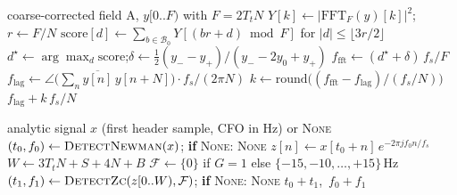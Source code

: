 \begin{algorithm}[H]
\caption{\textsc{ResidualCfo} for one-symbol blocks ($s = 1$, NORMAL float): FFT peak plus unwrapped lag-$N$ phase.}
\label{alg:tone_resid}
\begin{algorithmic}[1]
\Require coarse-corrected field A, $y[0..F)$ with $F = 2T_tN$
\State $Y[k] \gets |\mathrm{FFT}_F(y)[k]|^2$;\quad $r \gets F/N$ 
\State $\mathrm{score}[d] \gets \sum_{b \in \mathcal{B}_0} Y[(br + d) \bmod F]$ for $|d| \le \lfloor 3r/2 \rfloor$ 
\State $d^\star \gets \arg\max_d \mathrm{score}$;\quad $\delta \gets \tfrac{1}{2}(y_{-} - y_{+}) / (y_{-} - 2y_0 + y_{+})$ 
\State $f_{\mathrm{fft}} \gets (d^\star + \delta)\, f_s / F$ 
\State $f_{\mathrm{lag}} \gets \angle\big(\sum_n \overline{y[n]}\, y[n{+}N]\big) \cdot f_s / (2\pi N)$ 
\State $k \gets \mathrm{round}\big((f_{\mathrm{fft}} - f_{\mathrm{lag}}) / (f_s/N)\big)$
\State \Return $f_{\mathrm{lag}} + k\, f_s/N$ 
\end{algorithmic}
\end{algorithm}

\begin{algorithm}[H]
\caption{Composite detector (\texttt{FullOFDMModem.detect\_preamble}): tone stage, then the ZC stage of \S\ref{sec:zc}.}
\label{alg:tone_composite}
\begin{algorithmic}[1]
\Require analytic signal $x$
\Ensure (first header sample, CFO in Hz) or \textsc{None}
\State $(t_0, f_0) \gets \textsc{DetectNewman}(x)$; \textbf{if} \textsc{None}: \Return \textsc{None} 
\State $z[n] \gets x[t_0 + n]\, e^{-2\pi j f_0 n / f_s}$ 
\State $W \gets 3T_tN + S + 4N + B$ 
\State $\mathcal{F} \gets \{0\}$ if $G = 1$ else $\{-15, -10, \ldots, +15\}$\,Hz 
\State $(t_1, f_1) \gets \textsc{DetectZc}(z[0..W), \mathcal{F})$; \textbf{if} \textsc{None}: \Return \textsc{None} 
\State \Return $t_0 + t_1$,\ $f_0 + f_1$
\end{algorithmic}
\end{algorithm}

